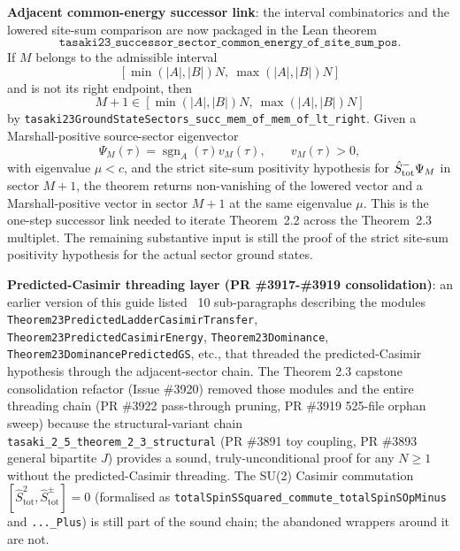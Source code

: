 \documentclass[a4paper,11pt]{article}
\begin{document}
\textbf{Adjacent common-energy successor link}: the interval
combinatorics and the lowered site-sum comparison are now packaged in
the Lean theorem
\[
\texttt{tasaki23\_successor\_sector\_common\_energy\_of\_site\_sum\_pos}.
\]
If \(M\) belongs to the admissible interval
\[
  [\min(|A|,|B|)N,\ \max(|A|,|B|)N]
\]
and is not its right endpoint, then
\[
  M+1 \in
  [\min(|A|,|B|)N,\ \max(|A|,|B|)N]
\]
by \texttt{tasaki23GroundStateSectors\_succ\_mem\_of\_mem\_of\_lt\_right}.
Given a Marshall-positive source-sector eigenvector
\[
  \Psi_M(\tau)=\operatorname{sgn}_A(\tau)v_M(\tau), \qquad v_M(\tau)>0,
\]
with eigenvalue \(\mu<c\), and the strict site-sum positivity hypothesis
for \(\hat S^-_{\rm tot}\Psi_M\) in sector \(M+1\), the theorem returns
non-vanishing of the lowered vector and a Marshall-positive vector in
sector \(M+1\) at the same eigenvalue \(\mu\).  This is the one-step
successor link needed to iterate Theorem~2.2 across the Theorem~2.3
multiplet.  The remaining substantive input is still the proof of the
strict site-sum positivity hypothesis for the actual sector ground
states.

\textbf{Predicted-Casimir threading layer (PR \#3917-\#3919 consolidation)}: an earlier version of this guide listed ~10 sub-paragraphs describing the modules \texttt{Theorem23PredictedLadderCasimirTransfer}, \texttt{Theorem23PredictedCasimirEnergy}, \texttt{Theorem23Dominance}, \texttt{Theorem23DominancePredictedGS}, etc., that threaded the predicted-Casimir hypothesis through the adjacent-sector chain. The Theorem 2.3 capstone consolidation refactor (Issue \#3920) removed those modules and the entire threading chain (PR \#3922 pass-through pruning, PR \#3919 525-file orphan sweep) because the structural-variant chain \texttt{tasaki\_2\_5\_theorem\_2\_3\_structural} (PR \#3891 toy coupling, PR \#3893 general bipartite \(J\)) provides a sound, truly-unconditional proof for any \(N \ge 1\) without the predicted-Casimir threading. The SU(2) Casimir commutation \([\hat S_{\mathrm{tot}}^2,\hat S^\pm_{\mathrm{tot}}]=0\) (formalised as \texttt{totalSpinSSquared\_commute\_totalSpinSOpMinus} and \texttt{...\_Plus}) is still part of the sound chain; the abandoned wrappers around it are not.
\end{document}
